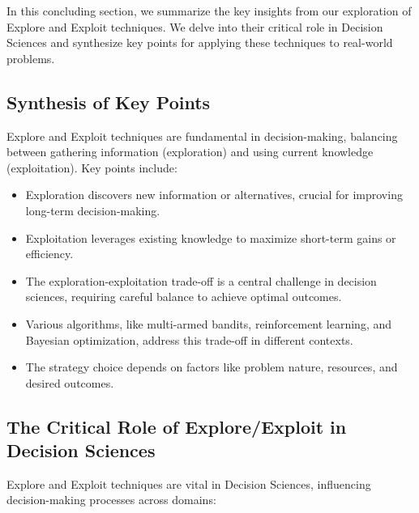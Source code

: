 \documentclass[12pt]{book} %
\begin{document}
In this concluding section, we summarize the key insights from our exploration of Explore and Exploit techniques. We delve into their critical role in Decision Sciences and synthesize key points for applying these techniques to real-world problems.

\subsection{Synthesis of Key Points}

Explore and Exploit techniques are fundamental in decision-making, balancing between gathering information (exploration) and using current knowledge (exploitation). Key points include:

\begin{itemize}
    \item Exploration discovers new information or alternatives, crucial for improving long-term decision-making.
    \item Exploitation leverages existing knowledge to maximize short-term gains or efficiency.
    \item The exploration-exploitation trade-off is a central challenge in decision sciences, requiring careful balance to achieve optimal outcomes.
    \item Various algorithms, like multi-armed bandits, reinforcement learning, and Bayesian optimization, address this trade-off in different contexts.
    \item The strategy choice depends on factors like problem nature, resources, and desired outcomes.
\end{itemize}

\subsection{The Critical Role of Explore/Exploit in Decision Sciences}

Explore and Exploit techniques are vital in Decision Sciences, influencing decision-making processes across domains:
\end{document}
